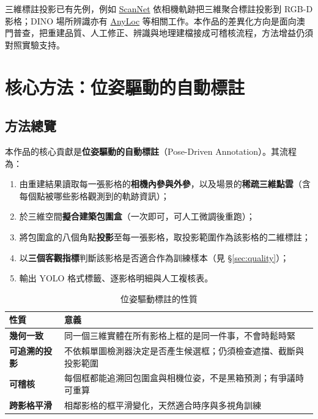 \documentclass[11pt,a4paper,fontset=windows]{ctexart}
\newcommand{\key}[1]{\textbf{\color{ink}#1}}
\begin{document}
三維標註投影已有先例，例如 \href{https://github.com/ScanNet/ScanNet}{ScanNet} 依相機軌跡把三維聚合標註投影到 RGB-D 影格；DINO 場所辨識亦有 \href{https://anyloc.github.io/}{AnyLoc} 等相關工作。本作品的差異化方向是面向澳門普查，把重建品質、人工修正、辨識與地理建檔接成可稽核流程，方法增益仍須對照實驗支持。

\section{核心方法：位姿驅動的自動標註}

\subsection{方法總覽}

本作品的核心貢獻是\textbf{位姿驅動的自動標註}（Pose-Driven Annotation）。其流程為：

\begin{enumerate}[leftmargin=1.5em,itemsep=2pt]
\item 由重建結果讀取每一張影格的\textbf{相機內參與外參}，以及場景的\textbf{稀疏三維點雲}（含每個點被哪些影格觀測到的軌跡資訊）；
\item 於三維空間\textbf{擬合建築包圍盒}（一次即可，可人工微調後重跑）；
\item 將包圍盒的八個角點\textbf{投影}至每一張影格，取投影範圍作為該影格的二維標註；
\item 以\textbf{三個客觀指標}判斷該影格是否適合作為訓練樣本（見 \S\ref{sec:quality}）；
\item 輸出 YOLO 格式標籤、逐影格明細與人工複核表。
\end{enumerate}

\begin{table}[H]
\centering
\small
\caption{位姿驅動標註的性質}
\begin{tabular}{p{3.2cm}p{10.6cm}}
\toprule
\textbf{性質} & \textbf{意義} \\
\midrule
\key{幾何一致} & 同一個三維實體在所有影格上框的是同一件事，不會時鬆時緊 \\
\key{可追溯的投影} & 不依賴單圖檢測器決定是否產生候選框；仍須檢查遮擋、截斷與投影範圍 \\
\key{可稽核} & 每個框都能追溯回包圍盒與相機位姿，不是黑箱預測；有爭議時可重算 \\
\key{跨影格平滑} & 相鄰影格的框平滑變化，天然適合時序與多視角訓練 \\
\bottomrule
\end{tabular}
\end{table}
\end{document}
